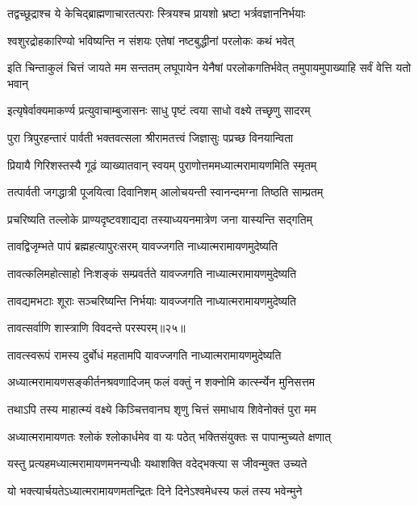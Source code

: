 \twolineshloka
{तद्वच्छूद्राश्च ये केचिद्ब्राह्मणाचारतत्पराः}
{स्त्रियश्च प्रायशो भ्रष्टा भर्त्रवज्ञाननिर्भयाः} %

\twolineshloka
{श्वशुरद्रोहकारिण्यो भविष्यन्ति न संशयः}
{एतेषां नष्टबुद्धीनां परलोकः कथं भवेत्} %

\threelineshloka
{इति चिन्ताकुलं चित्तं जायते मम सन्ततम्}
{लघूपायेन येनैषां परलोकगतिर्भवेत्}
{तमुपायमुपाख्याहि सर्वं वेत्ति यतो भवान्} %

\twolineshloka
{इत्यृषेर्वाक्यमाकर्ण्य प्रत्युवाचाम्बुजासनः}
{साधु पृष्टं त्वया साधो वक्ष्ये तच्छृणु सादरम्} %

\twolineshloka
{पुरा त्रिपुरहन्तारं पार्वती भक्तवत्सला}
{श्रीरामतत्त्वं जिज्ञासुः पप्रच्छ विनयान्विता} %

\twolineshloka
{प्रियायै गिरिशस्तस्यै गूढं व्याख्यातवान् स्वयम्}
{पुराणोत्तममध्यात्मरामायणमिति स्मृतम्} %

\twolineshloka
{तत्पार्वती जगद्धात्री पूजयित्वा दिवानिशम्}
{आलोचयन्ती स्वानन्दमग्ना तिष्ठति साम्प्रतम्} %

\twolineshloka
{प्रचरिष्यति तल्लोके प्राण्यदृष्टवशाद्यदा}
{तस्याध्ययनमात्रेण जना यास्यन्ति सद्गतिम्} %

\twolineshloka
{तावद्विजृम्भते पापं ब्रह्महत्यापुरःसरम्}
{यावज्जगति नाध्यात्मरामायणमुदेष्यति} %

\twolineshloka
{तावत्कलिमहोत्साहो निःशङ्कं सम्प्रवर्तते}
{यावज्जगति नाध्यात्मरामायणमुदेष्यति} %

\twolineshloka
{तावद्यमभटाः शूराः सञ्चरिष्यन्ति निर्भयाः}
{यावज्जगति नाध्यात्मरामायणमुदेष्यति} %

{तावत्सर्वाणि शास्त्राणि विवदन्ते परस्परम्॥२५॥} %


\twolineshloka
{तावत्स्वरूपं रामस्य दुर्बोधं महतामपि}
{यावज्जगति नाध्यात्मरामायणमुदेष्यति} %

\twolineshloka
{अध्यात्मरामायणसङ्कीर्तनश्रवणादिजम्}
{फलं वक्तुं न शक्नोमि कार्त्स्न्येन मुनिसत्तम} %

\twolineshloka
{तथाऽपि तस्य माहात्म्यं वक्ष्ये किञ्चित्तवानघ}
{शृणु चित्तं समाधाय शिवेनोक्तं पुरा मम} %

\twolineshloka
{अध्यात्मरामायणतः श्लोकं श्लोकार्धमेव वा}
{यः पठेत् भक्तिसंयुक्तः स पापान्मुच्यते क्षणात्} %

\twolineshloka
{यस्तु प्रत्यहमध्यात्मरामायणमनन्यधीः}
{यथाशक्ति वदेद्भक्त्या स जीवन्मुक्त उच्यते} %

\twolineshloka
{यो भक्त्यार्चयतेऽध्यात्मरामायणमतन्द्रितः}
{दिने दिनेऽश्वमेधस्य फलं तस्य भवेन्मुने} %

